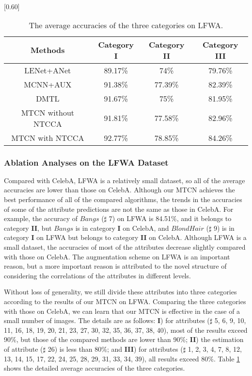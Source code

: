 \documentclass{sig-alternate-05-2015}
\begin{document}
\begin{table}[!hbpt]
\centering
\caption{The average accuracies of the three categories on LFWA.}
\scalebox{0.65}[0.60]{%
\begin{tabular}{c|c|c|c}
\toprule[2pt]
\textbf{Methods} & \textbf{Category I}&\textbf{Category II}&\textbf{Category III}\\\midrule[1pt]
LENet+ANet\cite{7410782}&89.17\%&74\%&79.76\%\\
\hline
MCNN+AUX\cite{hand2017attributes}&91.38\%&77.39\%&82.39\%\\
\hline
DMTL\cite{Han2017Heterogeneous}&91.67\%&75\%&81.95\%\\
\hline
MTCN without NTCCA&91.81\%&77.58\%&82.96\%\\
\hline
MTCN with NTCCA&92.77\%&78.85\%&84.26\%\\
\bottomrule[2pt]
\end{tabular}}
\label{tab:026}
\end{table}










\subsubsection{Ablation Analyses on the LFWA Dataset}
Compared with CelebA, LFWA is a relatively small dataset, so all of the average accuracies are lower than those on CelebA. Although our MTCN achieves the best performance of all of the compared algorithms, the trends in the accuracies of some of the attribute predictions are not the same as those in CelebA. For example, the accuracy of $Bangs$  ($\sharp$ 7) on LFWA is 84.51\%, and it belongs to category \textbf{II}, but $Bangs$ is in category \textbf{I} on CelebA, and $BlondHair$ ($\sharp$ 9) is in category \textbf{I} on LFWA but belongs to category \textbf{II} on CelebA. Although LFWA is a small dataset, the accuracies of most of the attributes decrease slightly compared with those on CelebA. The augmentation scheme on LFWA is an important reason, but a more important reason is attributed to the novel structure of considering the correlations of the attributes in different levels.





 Without loss of generality, we still divide these attributes into three categories according to the results of our MTCN on LFWA. Comparing the three categories with those on CelebA, we can learn that our MTCN is effective in the case of a small number of images. The details are as follows: \textbf{I}) for attributes ($\sharp$ 5, 6, 9, 10, 11, 16, 18, 19, 20, 21, 23, 27, 30, 32, 35, 36, 37, 38, 40), most of the results exceed 90\%, but those of the compared methods are lower than 90\%; \textbf{II}) the estimation of attribute ($\sharp$ 26) is less than 80\%; and \textbf{III}) for attributes ($\sharp$ 1, 2, 3, 4, 7, 8, 12, 13, 14, 15, 17, 22, 24, 25, 28, 29, 31, 33, 34, 39), all results exceed 80\%. Table \ref{tab:026} shows the detailed average accuracies of the three categories.
\end{document}
